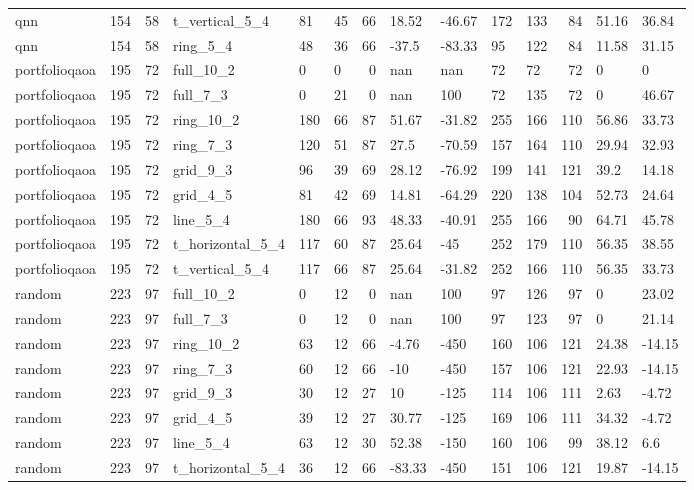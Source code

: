 \begin{longtable}{lrrlllrllllrll}
qnn & 154 & 58 & t\_vertical\_5\_4 & 81 & 45 & 66 & 18.52 & -46.67 & 172 & 133 & 84 & 51.16 & 36.84 \\
qnn & 154 & 58 & ring\_5\_4 & 48 & 36 & 66 & -37.5 & -83.33 & 95 & 122 & 84 & 11.58 & 31.15 \\
portfolioqaoa & 195 & 72 & full\_10\_2 & 0 & 0 & 0 & nan & nan & 72 & 72 & 72 & 0 & 0 \\
portfolioqaoa & 195 & 72 & full\_7\_3 & 0 & 21 & 0 & nan & 100 & 72 & 135 & 72 & 0 & 46.67 \\
portfolioqaoa & 195 & 72 & ring\_10\_2 & 180 & 66 & 87 & 51.67 & -31.82 & 255 & 166 & 110 & 56.86 & 33.73 \\
portfolioqaoa & 195 & 72 & ring\_7\_3 & 120 & 51 & 87 & 27.5 & -70.59 & 157 & 164 & 110 & 29.94 & 32.93 \\
portfolioqaoa & 195 & 72 & grid\_9\_3 & 96 & 39 & 69 & 28.12 & -76.92 & 199 & 141 & 121 & 39.2 & 14.18 \\
portfolioqaoa & 195 & 72 & grid\_4\_5 & 81 & 42 & 69 & 14.81 & -64.29 & 220 & 138 & 104 & 52.73 & 24.64 \\
portfolioqaoa & 195 & 72 & line\_5\_4 & 180 & 66 & 93 & 48.33 & -40.91 & 255 & 166 & 90 & 64.71 & 45.78 \\
portfolioqaoa & 195 & 72 & t\_horizontal\_5\_4 & 117 & 60 & 87 & 25.64 & -45 & 252 & 179 & 110 & 56.35 & 38.55 \\
portfolioqaoa & 195 & 72 & t\_vertical\_5\_4 & 117 & 66 & 87 & 25.64 & -31.82 & 252 & 166 & 110 & 56.35 & 33.73 \\
random & 223 & 97 & full\_10\_2 & 0 & 12 & 0 & nan & 100 & 97 & 126 & 97 & 0 & 23.02 \\
random & 223 & 97 & full\_7\_3 & 0 & 12 & 0 & nan & 100 & 97 & 123 & 97 & 0 & 21.14 \\
random & 223 & 97 & ring\_10\_2 & 63 & 12 & 66 & -4.76 & -450 & 160 & 106 & 121 & 24.38 & -14.15 \\
random & 223 & 97 & ring\_7\_3 & 60 & 12 & 66 & -10 & -450 & 157 & 106 & 121 & 22.93 & -14.15 \\
random & 223 & 97 & grid\_9\_3 & 30 & 12 & 27 & 10 & -125 & 114 & 106 & 111 & 2.63 & -4.72 \\
random & 223 & 97 & grid\_4\_5 & 39 & 12 & 27 & 30.77 & -125 & 169 & 106 & 111 & 34.32 & -4.72 \\
random & 223 & 97 & line\_5\_4 & 63 & 12 & 30 & 52.38 & -150 & 160 & 106 & 99 & 38.12 & 6.6 \\
random & 223 & 97 & t\_horizontal\_5\_4 & 36 & 12 & 66 & -83.33 & -450 & 151 & 106 & 121 & 19.87 & -14.15 \\

\end{longtable}
